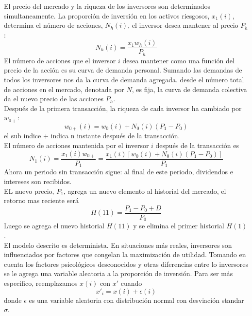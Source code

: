 \documentclass[12pt,a4paper]{article}
\begin{document}
\quad El precio del mercado y la riqueza de los inversores son determinados simultaneamente. La proporción de inversión en los activos riesgosos, $x_1(i)$, determina el número de acciones, $N_h(i)$, el inversor desea mantener al precio $P_h$:
\begin{equation}
N_h(i) = \frac{x_1w_h(i)}{P_h}
\end{equation} 
\quad El número de acciones que el inversor $i$ desea mantener como una función del precio de la acción es su curva de demanda personal. Sumando las demandas de todos los inversores nos da la curva de demanda agregada. desde el número total de acciones en el mercado, denotada por $N$, es fija, la curva de demanda colectiva da el nuevo precio de las acciones $P_h$.\\
\quad Después de la primera transacción, la riqueza de cada inversor ha cambiado por $w_{0+}$:
\begin{equation}
w_{0+}(i) = w_0(i) +N_0(i)(P_1-P_0)
\end{equation} 
el sub indice $+$ indica n instante después de la transacción.\\
\quad El número de acciones mantenida por el inversor $i$ después de la transacción es
\begin{equation}
N_1(i)=\frac{x_1(i)w_{0+}}{P_1}=\frac{x_1(i)[w_0(i) +N_0(i)(P_1-P_0)]}{P_1}
\end{equation} 
\quad Ahora un periodo sin transacción sigue: al final de este periodo, dividendos e intereses son recibidos.\\
\quad EL nuevo precio, $P_1$, agrega un nuevo elemento al historial del mercado, el retorno mas reciente será
\begin{equation}
H(11) = \frac{P_1-P_0+D}{P_0}
\end{equation}
Luego se agrega el nuevo historial $H(11)$ y se elimina el primer historial $H(1)$.\\
\quad El modelo descrito es determinista. En situaciones más reales, inversores son influenciados por factores que congelan la maximización de utilidad. Tomando en cuenta los factores psicológicos desconocidos y otras diferencias entre lo inversores se le agrega una variable aleatoria a la proporción de inversión. Para ser más especifico, reemplazamos $x(i)$ con $x'$ cuando
\begin{equation}
x'_i = x(i) + \epsilon(i)
\end{equation}
donde $\epsilon$ es una variable aleatoria con distribución normal con desviación standar $\sigma$. 
\end{document}
